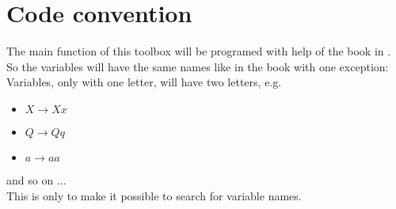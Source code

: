 \section{Code convention}

The main function of this toolbox will be programed with help of the book in \cite{4}.
So the variables will have the same names like in the book with one exception: Variables, only with one letter, will have two letters, e.g. 
\begin{itemize}
	\item $X \rightarrow Xx$
	\item $Q \rightarrow Qq$
	\item $a \rightarrow aa$
\end{itemize}
and so on ...\\

This is only to make it possible to search for variable names.
